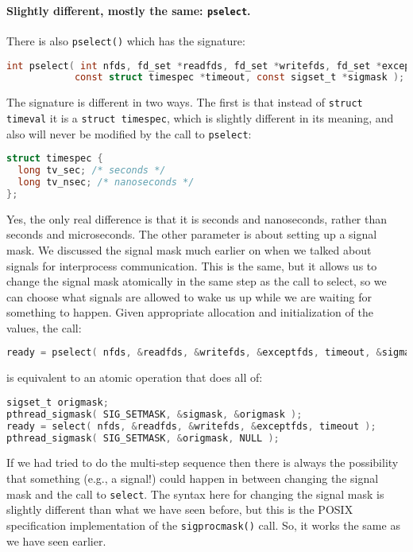 \paragraph{Slightly different, mostly the same: \texttt{pselect}.}
There is also \texttt{pselect()} which has the signature:
\begin{lstlisting}[language=C]
int pselect( int nfds, fd_set *readfds, fd_set *writefds, fd_set *exceptfds, 
            const struct timespec *timeout, const sigset_t *sigmask );
\end{lstlisting}

The signature is different in two ways. The first is that instead of \texttt{struct timeval} it is a \texttt{struct timespec}, which is slightly different in its meaning, and also will never be modified by the call to \texttt{pselect}:

\begin{lstlisting}[language=C]
struct timespec {
  long tv_sec; /* seconds */
  long tv_nsec; /* nanoseconds */
};
\end{lstlisting}

Yes, the only real difference is that it is seconds and nanoseconds, rather than seconds and microseconds. The other parameter is about setting up a signal mask. We discussed the signal mask much earlier on when we talked about signals for interprocess communication. This is the same, but it allows us to change the signal mask atomically in the same step as the call to select, so we can choose what signals are allowed to wake us up while we are waiting for something to happen. Given appropriate allocation and initialization of the values, the call:


\begin{lstlisting}[language=C]
ready = pselect( nfds, &readfds, &writefds, &exceptfds, timeout, &sigmask );
\end{lstlisting}

is equivalent to an atomic operation that does all of:

\begin{lstlisting}[language=C]
sigset_t origmask;
pthread_sigmask( SIG_SETMASK, &sigmask, &origmask );
ready = select( nfds, &readfds, &writefds, &exceptfds, timeout );
pthread_sigmask( SIG_SETMASK, &origmask, NULL );
\end{lstlisting}

If we had tried to do the multi-step sequence then there is always the possibility that something (e.g., a signal!) could happen in between changing the signal mask and the call to \texttt{select}. The syntax here for changing the signal mask is slightly different than what we have seen before, but this is the POSIX specification implementation of the \texttt{sigprocmask()} call. So, it works the same as we have seen earlier.


